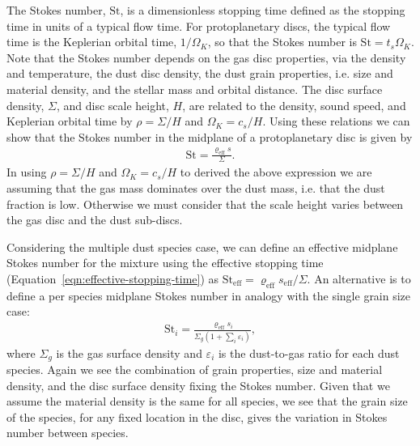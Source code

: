 \documentclass[fleqn,usenatbib]{mnras}
\begin{document}
The Stokes number, \(\mathrm{St}\), is a dimensionless stopping time defined as
the stopping time in units of a typical flow time. For protoplanetary discs, the
typical flow time is the Keplerian orbital time, \(1/\Omega_K\), so that the
Stokes number is \(\mathrm{St} = t_s \Omega_K\). Note that the Stokes number
depends on the gas disc properties, via the density and temperature, the dust
disc density, the dust grain properties, i.e. size and material density, and the
stellar mass and orbital distance. The disc surface density, \(\Sigma\), and
disc scale height, \(H\), are related to the density, sound speed, and Keplerian
orbital time by \(\rho = \Sigma / H\) and \(\Omega_K = c_s / H\). Using these
relations we can show that the Stokes number in the midplane of a protoplanetary
disc is given by
%
\begin{align}
   \mathrm{St} = \frac{\varrho_{\mathrm{eff}} s}{\Sigma}.
\end{align}
%
In using \(\rho = \Sigma / H\) and \(\Omega_K = c_s / H\) to derived the above
expression we are assuming that the gas mass dominates over the dust mass, i.e.
that the dust fraction is low. Otherwise we must consider that the scale height
varies between the gas disc and the dust sub-discs.

Considering the multiple dust species case, we can define an effective midplane
Stokes number for the mixture using the effective stopping time
(Equation~\ref{eqn:effective-stopping-time}) as \(\mathrm{St}_{\mathrm{eff}} =
\varrho_{\mathrm{eff}} s_{\mathrm{eff}} / \Sigma \). An alternative is to define
a per species midplane Stokes number in analogy with the single grain size case:
%
\begin{align}
   \label{eqn:stokes}
   \mathrm{St}_i = \frac{\varrho_{\mathrm{eff}} s_i}
      {\Sigma_g \left(1 + \sum_i \varepsilon_i \right)},
\end{align}
%
where \(\Sigma_g\) is the gas surface density and \(\varepsilon_i\) is the
dust-to-gas ratio for each dust species. Again we see the combination of grain
properties, size and material density, and the disc surface density fixing the
Stokes number. Given that we assume the material density is the same for all
species, we see that the grain size of the species, for any fixed location in
the disc, gives the variation in Stokes number between species.
\end{document}
